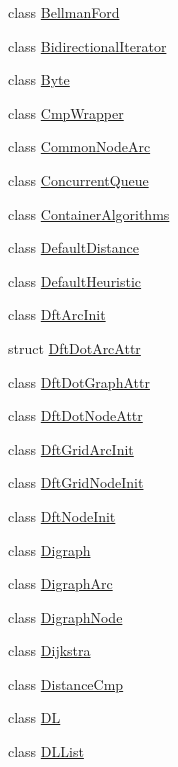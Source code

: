 \begin{DoxyCompactItemize}
class \hyperlink{class_designar_1_1_bellman_ford}{Bellman\+Ford}
\item 
class \hyperlink{class_designar_1_1_bidirectional_iterator}{Bidirectional\+Iterator}
\item 
class \hyperlink{class_designar_1_1_byte}{Byte}
\item 
class \hyperlink{class_designar_1_1_cmp_wrapper}{Cmp\+Wrapper}
\item 
class \hyperlink{class_designar_1_1_common_node_arc}{Common\+Node\+Arc}
\item 
class \hyperlink{class_designar_1_1_concurrent_queue}{Concurrent\+Queue}
\item 
class \hyperlink{class_designar_1_1_container_algorithms}{Container\+Algorithms}
\item 
class \hyperlink{class_designar_1_1_default_distance}{Default\+Distance}
\item 
class \hyperlink{class_designar_1_1_default_heuristic}{Default\+Heuristic}
\item 
class \hyperlink{class_designar_1_1_dft_arc_init}{Dft\+Arc\+Init}
\item 
struct \hyperlink{struct_designar_1_1_dft_dot_arc_attr}{Dft\+Dot\+Arc\+Attr}
\item 
class \hyperlink{class_designar_1_1_dft_dot_graph_attr}{Dft\+Dot\+Graph\+Attr}
\item 
class \hyperlink{class_designar_1_1_dft_dot_node_attr}{Dft\+Dot\+Node\+Attr}
\item 
class \hyperlink{class_designar_1_1_dft_grid_arc_init}{Dft\+Grid\+Arc\+Init}
\item 
class \hyperlink{class_designar_1_1_dft_grid_node_init}{Dft\+Grid\+Node\+Init}
\item 
class \hyperlink{class_designar_1_1_dft_node_init}{Dft\+Node\+Init}
\item 
class \hyperlink{class_designar_1_1_digraph}{Digraph}
\item 
class \hyperlink{class_designar_1_1_digraph_arc}{Digraph\+Arc}
\item 
class \hyperlink{class_designar_1_1_digraph_node}{Digraph\+Node}
\item 
class \hyperlink{class_designar_1_1_dijkstra}{Dijkstra}
\item 
class \hyperlink{class_designar_1_1_distance_cmp}{Distance\+Cmp}
\item 
class \hyperlink{class_designar_1_1_d_l}{DL}
\item 
class \hyperlink{class_designar_1_1_d_l_list}{D\+L\+List}
\item 

\end{DoxyCompactItemize}
